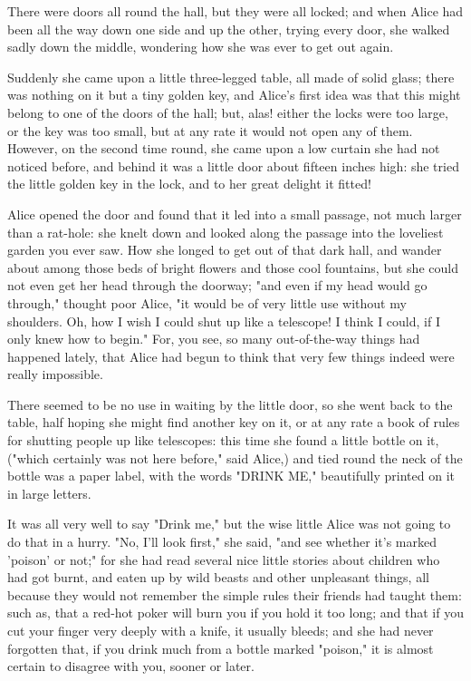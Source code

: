\documentclass[aps,prb,amsmath,twocolumn,amssymb,titlepage]{revtex4-2}
\begin{document}
There were doors all round the hall, but they were all locked; and when Alice had been all the way down one side and up the other, trying every door, she walked sadly down the middle, wondering how she was ever to get out again.

Suddenly she came upon a little three-legged table, all made of solid glass; there was nothing on it but a tiny golden key, and Alice's first idea was that this might belong to one of the doors of the hall; but, alas! either the locks were too large, or the key was too small, but at any rate it would not open any of them. However, on the second time round, she came upon a low curtain she had not noticed before, and behind it was a little door about fifteen inches high: she tried the little golden key in the lock, and to her great delight it fitted!

Alice opened the door and found that it led into a small passage, not much larger than a rat-hole: she knelt down and looked along the passage into the loveliest garden you ever saw. How she longed to get out of that dark hall, and wander about among those beds of bright flowers and those cool fountains, but she could not even get her head through the doorway; "and even if my head would go through," thought poor Alice, "it would be of very little use without my shoulders. Oh, how I wish I could shut up like a telescope! I think I could, if I only knew how to begin." For, you see, so many out-of-the-way things had happened lately, that Alice had begun to think that very few things indeed were really impossible.

There seemed to be no use in waiting by the little door, so she went back to the table, half hoping she might find another key on it, or at any rate a book of rules for shutting people up like telescopes: this time she found a little bottle on it, ("which certainly was not here before," said Alice,) and tied round the neck of the bottle was a paper label, with the words "DRINK ME," beautifully printed on it in large letters.

It was all very well to say "Drink me," but the wise little Alice was not going to do that in a hurry. "No, I'll look first," she said, "and see whether it's marked 'poison' or not;" for she had read several nice little stories about children who had got burnt, and eaten up by wild beasts and other unpleasant things, all because they would not remember the simple rules their friends had taught them: such as, that a red-hot poker will burn you if you hold it too long; and that if you cut your finger very deeply with a knife, it usually bleeds; and she had never forgotten that, if you drink much from a bottle marked "poison," it is almost certain to disagree with you, sooner or later.
\end{document}
